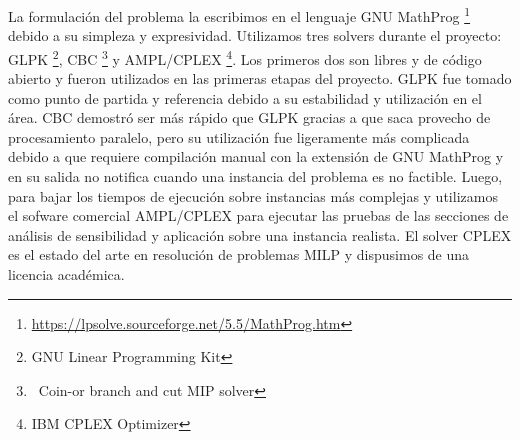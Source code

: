 La formulación del problema la escribimos en el lenguaje GNU MathProg \footnote{\url{https://lpsolve.sourceforge.net/5.5/MathProg.htm}} debido a su simpleza y expresividad. Utilizamos tres solvers durante el proyecto: GLPK \footnote{GNU Linear Programming Kit}, CBC \footnote{\ Coin-or branch and cut MIP solver} y AMPL/CPLEX \footnote{IBM CPLEX Optimizer}. Los primeros dos son libres y de código abierto y fueron utilizados en las primeras etapas del proyecto. GLPK fue tomado como punto de partida y referencia debido a su estabilidad y utilización en el área. CBC demostró ser más rápido que GLPK gracias a que saca provecho de procesamiento paralelo, pero su utilización fue ligeramente más complicada debido a que requiere compilación manual con la extensión de GNU MathProg y en su salida no notifica cuando una instancia del problema es no factible. Luego, para bajar los tiempos de ejecución sobre instancias más complejas y utilizamos el sofware comercial AMPL/CPLEX para ejecutar las pruebas de las secciones de análisis de sensibilidad y aplicación sobre una instancia realista. El solver CPLEX es el estado del arte en resolución de problemas MILP y dispusimos de una licencia académica.
